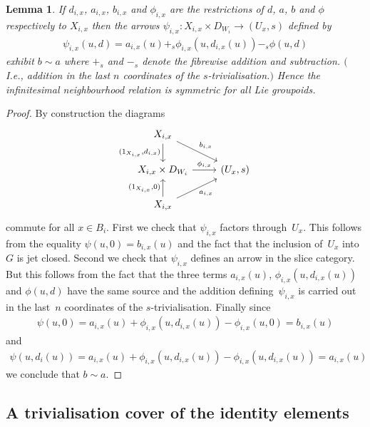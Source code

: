 \documentclass[10pt,a4paper]{amsart}
\numberwithin{equation}{section}
\newtheorem{Lemma}[Theorem]{Lemma}
\begin{document}
\begin{Lemma}\label{lem:approx-is-symmetric} If $d_{i,x}$, $a_{i,x}$, $b_{i,x}$ and $\phi_{i,x}$ are the restrictions of $d$, $a$, $b$ and $\phi$ respectively to $X_{i,x}$ then the arrows $\psi_{i,x}\colon X_{i,x}\times D_{W_i}\rightarrow (U_{x},s)$ defined by
\begin{gather*}\psi_{i,x}(u,d)=a_{i,x}(u)+_{s}\phi_{i,x}(u,d_{i,x}(u))-_{s}\phi(u,d)\end{gather*}
exhibit $b\sim a$ where $+_{s}$ and $-_{s}$ denote the fibrewise addition and subtraction. $($I.e., addition in the last $n$ coordinates of the $s$-trivialisation.$)$ Hence the infinitesimal neighbourhood relation is symmetric for all Lie groupoids.
\end{Lemma}
\begin{proof}
By construction the diagrams
\begin{equation*}
\begin{tikzcd}
 X_{i,x}\dar[swap]{(1_{X_{i,x}},d_{i,x})} \drar{b_{i,x}} {}\\
 X_{i,x} \times D_{W_i} \rar{\phi_{i,x}} & (U_{x},s)\\
 X_{i,x}\uar{(1_{X_{i,x}},0)} \urar[swap]{a_{i,x}} & {}
\end{tikzcd}
\end{equation*}
commute for all $x\in B_i$. First we check that $\psi_{i,x}$ factors through~$U_x$. This follows from the equality $\psi(u,0)=b_{i,x}(u)$ and the fact that the inclusion of~$U_x$ into~$G$ is jet closed. Second we check that $\psi_{i,x}$ def\/ines an arrow in the slice category. But this follows from the fact that the three terms $a_{i,x}(u)$, $\phi_{i,x}(u,d_{i,x}(u))$ and $\phi(u,d)$ have the same source and the addition def\/i\-ning~$\psi_{i,x}$ is carried out in the last~$n$ coordinates of the $s$-trivialisation. Finally since
\begin{gather*}\psi(u,0)=a_{i,x}(u)+\phi_{i,x}(u,d_{i,x}(u))-\phi_{i,x}(u,0)=b_{i,x}(u)\end{gather*}
and
\begin{gather*}\psi(u,d_i(u))=a_{i,x}(u)+\phi_{i,x}(u,d_{i,x}(u))-\phi_{i,x}(u,d_{i,x}(u))=a_{i,x}(u)\end{gather*}
we conclude that $b\sim a$.
\end{proof}

\subsection{A trivialisation cover of the identity elements}\label{sec:trivialisation-of-identities}
\end{document}
